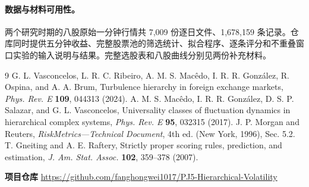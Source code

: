 \documentclass[11pt,a4paper]{article}
\begin{document}
\paragraph{数据与材料可用性。}
两个研究时期的八股原始一分钟行情共 7,009 份逐日文件、1,678,159 条记录。仓库同时提供五分钟收益、完整股票池的筛选统计、拟合程序、逐条评分和不重叠窗口实验的输入说明与结果。完整选股表和八股曲线分别见两份补充材料。
\small\begin{thebibliography}{9}\setlength{\itemsep}{0pt}
 G. L. Vasconcelos, L. R. C. Ribeiro, A. M. S. Mac\^edo,
I. R. R. Gonz\'alez, R. Ospina, and A. A. Brum, Turbulence hierarchy in foreign exchange markets,
\emph{Phys. Rev. E} \textbf{109}, 044313 (2024).
 A. M. S. Mac\^edo, I. R. R. Gonz\'alez, D. S. P. Salazar, and G. L. Vasconcelos,
Universality classes of fluctuation dynamics in hierarchical complex systems,
\emph{Phys. Rev. E} \textbf{95}, 032315 (2017).
 J. P. Morgan and Reuters, \emph{RiskMetrics---Technical Document},
4th ed. (New York, 1996), Sec. 5.2.
 T. Gneiting and A. E. Raftery, Strictly proper scoring rules, prediction,
and estimation, \emph{J. Am. Stat. Assoc.} \textbf{102}, 359--378 (2007).
\end{thebibliography}
\par\smallskip
\noindent\textbf{项目仓库}\quad
{\small\url{https://github.com/fanghongwei1017/PJ5-Hierarchical-Volatility}}
\end{document}
